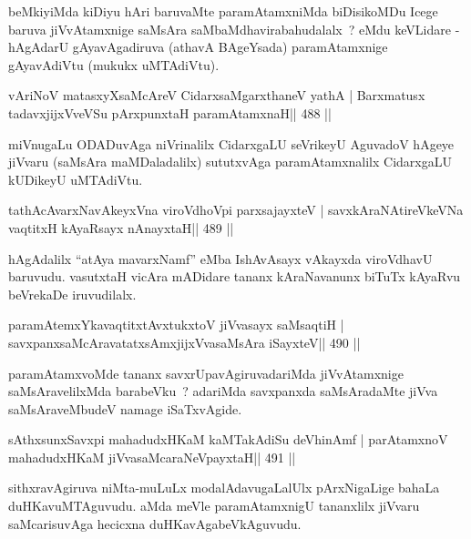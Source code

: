 \begin{artha}
beMkiyiMda kiDiyu hAri baruvaMte paramAtamxniMda biDisikoMDu Icege baruva jiVvAtamxnige saMsAra saMbaMdhavirabahudalalx~? eMdu keVLidare - hAgAdarU gAyavAgadiruva (athavA BAgeYsada) paramAtamxnige gAyavAdiVtu (mukukx uMTAdiVtu).
\end{artha}

\begin{shl}
vAriNoV matasxyXsaMcAreV CidarxsaMgarxthaneV yathA |
Barxmatusx tadavxjijxVveVSu pArxpunxtaH paramAtamxnaH\hfill || 488 ||
\end{shl}

\begin{artha}
miVnugaLu ODADuvAga niVrinalilx CidarxgaLU seVrikeyU AguvadoV hAgeye jiVvaru (saMsAra maMDaladalilx) sututxvAga paramAtamxnalilx CidarxgaLU kUDikeyU uMTAdiVtu.
\end{artha}

\begin{shl}
tathAcAvarxNavAkeyxVna viroVdhoV\s pi parxsajayxteV |
savxkAraNAtireVkeVNa vaqtitxH kAyaRsayx nAnayxtaH\hfill || 489 ||
\end{shl}

\begin{artha}
hAgAdalilx ``atAya mavarxNamf'' eMba IshAvAsayx vAkayxda viroVdhavU baruvudu. vasutxtaH vicAra mADidare tananx kAraNavanunx biTuTx kAyaRvu beVrekaDe iruvudilalx.
\end{artha}

\begin{shl}
paramAtemxYkavaqtitxtAvxtukxtoV jiVvasayx saMsaqtiH |
savxpanxsaMcAravatatxsAmxjijxVvasaMsAra iSayxteV\hfill || 490 ||
\end{shl}

\begin{artha}
paramAtamxvoMde tananx savxrUpavAgiruvadariMda jiVvAtamxnige saMsAravelilxMda barabeVku~? adariMda savxpanxda saMsAradaMte jiVva saMsAraveMbudeV namage iSaTxvAgide.
\end{artha}

\begin{shl}
sAthxsunxSavxpi mahadudxHKaM kaMTakAdiSu deVhinAmf |
parAtamxnoV mahadudxHKaM jiVvasaMcaraNeV\s payxtaH\hfill || 491 ||
\end{shl}

\begin{artha}
sithxravAgiruva niMta-muLuLx modalAdavugaLalUlx pArxNigaLige bahaLa duHKavuMTAguvudu. aMda meVle paramAtamxnigU tananxlilx jiVvaru saMcarisuvAga hecicxna duHKavAgabeVkAguvudu.
\end{artha}

